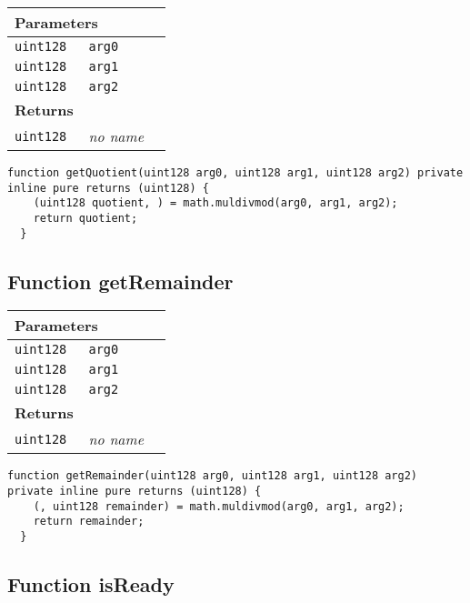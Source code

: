\ifsoltables
\noindent\begin{tabular}{|l|l|p{5cm}|}\hline
\multicolumn{3}{|l|}{\bf Parameters}\\\hline
\tt uint128 & \tt arg0 &\\\hline
\tt uint128 & \tt arg1 &\\\hline
\tt uint128 & \tt arg2 &\\\hline
\multicolumn{3}{|l|}{\bf Returns}\\\hline
\tt uint128 & {\em no name} &\\\hline
\end{tabular}
\fi



\begin{lstlisting}[firstnumber=109]
  function getQuotient(uint128 arg0, uint128 arg1, uint128 arg2) private inline pure returns (uint128) {
    (uint128 quotient, ) = math.muldivmod(arg0, arg1, arg2);
    return quotient;
  }
\end{lstlisting}

\subsection{Function getRemainder}


\ifsoltables
\noindent\begin{tabular}{|l|l|p{5cm}|}\hline
\multicolumn{3}{|l|}{\bf Parameters}\\\hline
\tt uint128 & \tt arg0 &\\\hline
\tt uint128 & \tt arg1 &\\\hline
\tt uint128 & \tt arg2 &\\\hline
\multicolumn{3}{|l|}{\bf Returns}\\\hline
\tt uint128 & {\em no name} &\\\hline
\end{tabular}
\fi



\begin{lstlisting}[firstnumber=115]
  function getRemainder(uint128 arg0, uint128 arg1, uint128 arg2) private inline pure returns (uint128) {
    (, uint128 remainder) = math.muldivmod(arg0, arg1, arg2);
    return remainder;
  }
\end{lstlisting}

\subsection{Function isReady}


